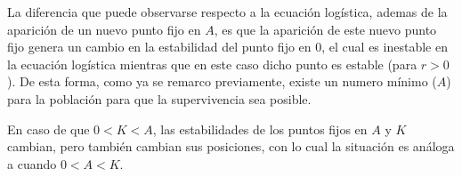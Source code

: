 La diferencia que puede observarse respecto a la ecuación logística, ademas de la aparición de un nuevo punto fijo en $A$, es que la aparición de este nuevo punto fijo genera un cambio en la estabilidad del punto fijo en $0$, el cual es inestable en la ecuación logística mientras que en este caso dicho punto es estable (para $r>0$). De esta forma, como ya se remarco previamente, existe un numero mínimo ($A$) para la población para que la supervivencia sea posible.

En caso de que $0<K<A$, las estabilidades de los puntos fijos en $A$ y $K$ cambian, pero también cambian sus posiciones, con lo cual la situación es análoga a cuando $0<A<K$.
